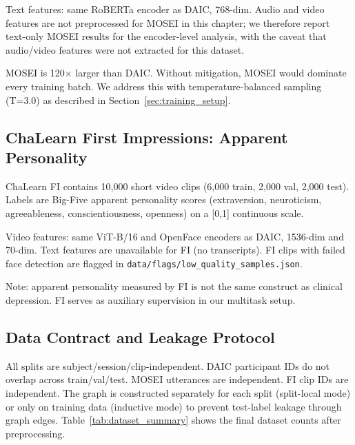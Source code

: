\documentclass[12pt,oneside]{book}
\begin{document}
Text features: same RoBERTa encoder as DAIC, 768-dim. Audio and video features are not preprocessed for MOSEI in this chapter; we therefore report text-only MOSEI results for the encoder-level analysis, with the caveat that audio/video features were not extracted for this dataset.

MOSEI is 120$\times$ larger than DAIC. Without mitigation, MOSEI would dominate every training batch. We address this with temperature-balanced sampling (T=3.0) as described in Section~\ref{sec:training_setup}.

\subsection{ChaLearn First Impressions: Apparent Personality}
\label{sec:fi}

ChaLearn FI \citep{escalante2020chalearn} contains 10,000 short video clips (6,000 train, 2,000 val, 2,000 test). Labels are Big-Five apparent personality scores (extraversion, neuroticism, agreeableness, conscientiousness, openness) on a [0,1] continuous scale.

Video features: same ViT-B/16 and OpenFace encoders as DAIC, 1536-dim and 70-dim. Text features are unavailable for FI (no transcripts). FI clips with failed face detection are flagged in \texttt{data/flags/low\_quality\_samples.json}.

Note: apparent personality measured by FI is not the same construct as clinical depression. FI serves as auxiliary supervision in our multitask setup.

\subsection{Data Contract and Leakage Protocol}
\label{sec:leakage_protocol}

All splits are subject/session/clip-independent. DAIC participant IDs do not overlap across train/val/test. MOSEI utterances are independent. FI clip IDs are independent. The graph is constructed separately for each split (split-local mode) or only on training data (inductive mode) to prevent test-label leakage through graph edges. Table~\ref{tab:dataset_summary} shows the final dataset counts after preprocessing.



\end{document}
